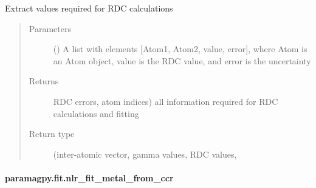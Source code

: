 \documentclass[a4paper,10pt,english]{sphinxmanual}
\begin{document}
\begin{fulllineitems}
\label{\detokenize{reference/generated/paramagpy.fit.extract_rdc:paramagpy.fit.extract_rdc}}
Extract values required for RDC calculations
\begin{quote}\begin{description}
\item[{Parameters}] \leavevmode
{} () \textendash{} A list with elements {[}Atom1, Atom2, value, error{]}, where Atom is
an Atom object, value is the RDC value, and error is the uncertainty

\item[{Returns}] \leavevmode
{} \textendash{}         RDC errors, atom indices)
all information required for RDC calculations and fitting

\item[{Return type}] \leavevmode
(inter-atomic vector, gamma values, RDC values,

\end{description}\end{quote}

\end{fulllineitems}



\paragraph{paramagpy.fit.nlr\_fit\_metal\_from\_ccr}
\label{\detokenize{reference/generated/paramagpy.fit.nlr_fit_metal_from_ccr:paramagpy-fit-nlr-fit-metal-from-ccr}}\label{\detokenize{reference/generated/paramagpy.fit.nlr_fit_metal_from_ccr::doc}}
\end{document}
